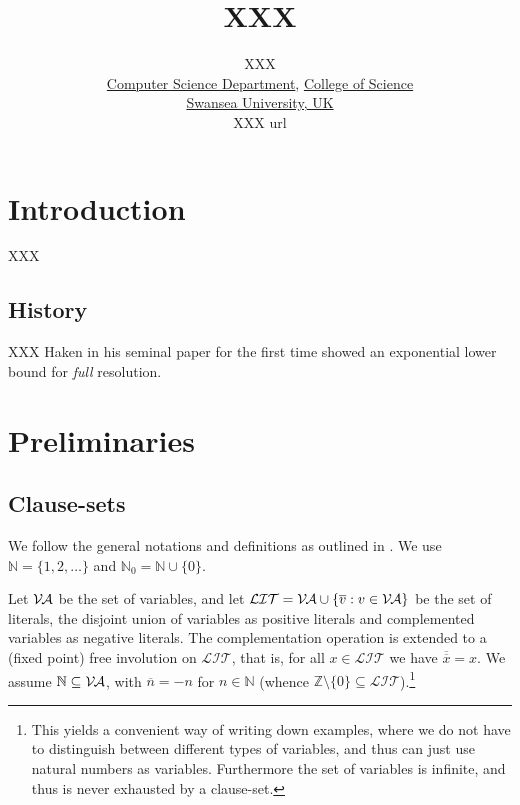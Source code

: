 \documentclass{report}
\newcommand{\set}[1]{\{ #1 \}}
\newcommand{\ol}{\overline}
\newcommand{\sm}{\setminus}
\newcommand{\sse}{\subseteq}
\newcommand{\mc}{\mathcal}
\newcommand{\ZZ}{\mathbb{Z}}
\newcommand{\NN}{\mathbb{N}}
\newcommand{\NNZ}{\NN_0}
\newcommand{\Va}{\mc{V\hspace{-0.1em}A}}
\newcommand{\Lit}{\mc{LIT}}
\begin{document}
\title{XXX}

\author{
  XXX\\
  \href{http://www.swan.ac.uk/compsci/}{Computer Science Department}, \href{http://www.swan.ac.uk/science/}{College of Science}\\
  \href{http://www.swan.ac.uk/}{Swansea University, UK}\\
  {XXX url}
}

\maketitle

\begin{abstract}
  
\end{abstract}

\tableofcontents

\chapter{Introduction}
\label{cha:Introduction}

XXX

\section{History}
\label{sec:History}

XXX Haken in his seminal paper \cite{Haken1985Intractability} for the first time showed an exponential lower bound for \emph{full} resolution.



\chapter{Preliminaries}
\label{cha:Preliminaries}

\section{Clause-sets}
\label{clause-sets}

We follow the general notations and definitions as outlined in \cite{Kullmann2007HandbuchMU}. We use $\NN = \set{1,2,\dots}$ and $\NNZ = \NN \cup \set{0}$.

Let $\Va$ be the set of variables, and let $\Lit = \Va \cup \set{\ol{v} : v \in \Va}$ be the set of literals, the disjoint union of variables as positive literals and complemented variables as negative literals. The complementation operation is extended to a (fixed point) free involution on $\Lit$, that is, for all $x \in \Lit$ we have $\ol{\ol{x}} = x$. We assume $\NN \sse \Va$, with $\ol{n} = -n$ for $n \in \NN$ (whence $\ZZ \sm \set{0} \sse \Lit$).\footnote{This yields a convenient way of writing down examples, where we do not have to distinguish between different types of variables, and thus can just use natural numbers as variables. Furthermore the set of variables is infinite, and thus is never exhausted by a clause-set.}
\end{document}

